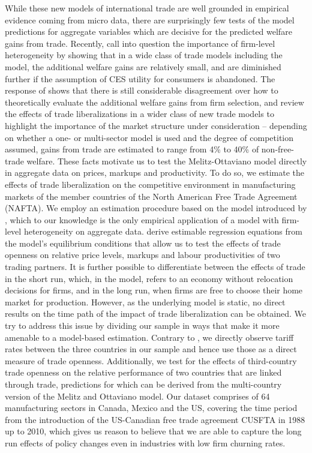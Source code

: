 While these new models of international trade are well grounded in empirical evidence coming from micro data, there are surprisingly few tests of the model predictions for aggregate variables which are decisive for the predicted welfare gains from trade. Recently, \citet{Arkolakisetal2012a,Arkolakisetal2012b} call into question the importance of firm-level heterogeneity by showing that in a wide class of trade models including the \citet{Melitz2003} model, the additional welfare gains are relatively small, and are diminished further if the assumption of CES utility for consumers is abandoned. The response of \citet{MelitzRedding2013} shows that there is still considerable disagreement over how to theoretically evaluate the additional welfare gains from firm selection, and \citet{CostinotRodriguez2014} review the effects of trade liberalizations in a wider class of new trade models to highlight the importance of the market structure under consideration -- depending on whether a one- or multi-sector model is used and the degree of competition assumed, gains from trade are estimated to range from 4\% to 40\% of non-free-trade welfare. These facts motivate us to test the Melitz-Ottaviano model directly in aggregate data on prices, markups and productivity. To do so, we estimate the effects of trade liberalization on the competitive environment in manufacturing markets of the member countries of the North American Free Trade Agreement (NAFTA). We employ an estimation procedure based on the \citet{MelitzOttaviano2008} model introduced by \citet{Chen2009}, which to our knowledge is the only empirical application of a model with firm-level heterogeneity on aggregate data. \citet{Chen2009} derive estimable regression equations from the model's equilibrium conditions that allow us to test the effects of trade openness on relative price levels, markups and labour productivities of two trading partners. It is further possible to differentiate between the effects of trade in the short run, which, in the model, refers to an economy without relocation decisions for firms, and in the long run, when firms are free to choose their home market for production. However, as the underlying model is static, no direct results on the time path of the impact of trade liberalization can be obtained. We try to address this issue by dividing our sample in ways that make it more amenable to a model-based estimation. Contrary to \citet{Chen2009}, we directly observe tariff rates between the three countries in our sample and hence use those as a direct measure of trade openness. Additionally, we test for the effects of third-country trade openness on the relative performance of two countries that are linked through trade, predictions for which can be derived from the multi-country version of the Melitz and Ottaviano model. Our dataset comprises of 64 manufacturing sectors in Canada, Mexico and the US, covering the time period from the introduction of the US-Canadian free trade agreement CUSFTA in 1988 up to 2010, which gives us reason to believe that we are able to capture the long run effects of policy changes even in industries with low firm churning rates. \\

